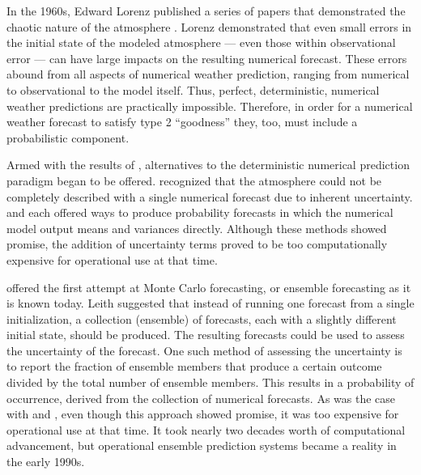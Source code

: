 In the 1960s, Edward Lorenz published a series of papers that demonstrated the chaotic nature of the atmosphere \citep{Lorenz1963, Lorenz1965, Lorenz1968}.
Lorenz demonstrated that even small errors in the initial state of the modeled atmosphere --- even those within observational error --- can have large impacts on the resulting numerical forecast.
These errors abound from all aspects of numerical weather prediction, ranging from numerical to observational to the model itself.
Thus, perfect, deterministic, numerical weather predictions are practically impossible.
Therefore, in order for a numerical weather forecast to satisfy type 2 ``goodness'' they, too, must include a probabilistic component.


Armed with the results of \cite{Lorenz1963, Lorenz1965, Lorenz1968}, alternatives to the deterministic numerical prediction paradigm began to be offered.
\cite{Epstein1969} recognized that the atmosphere could not be completely described with a single numerical forecast due to inherent uncertainty.
\cite{Epstein1969} and \cite{Gleeson1970} each offered ways to produce probability forecasts in which the numerical model output means and variances directly.
Although these methods showed promise, the addition of uncertainty terms proved to be too computationally expensive for operational use at that time.


\cite{Leith1974} offered the first attempt at Monte Carlo forecasting, or ensemble forecasting as it is known today.
Leith suggested that instead of running one forecast from a single initialization, a collection (ensemble) of forecasts, each with a slightly different initial state, should be produced.
The resulting forecasts could be used to assess the uncertainty of the forecast.
One such method of assessing the uncertainty is to report the fraction of ensemble members that produce a certain outcome divided by the total number of ensemble members.
This results in a probability of occurrence, derived from the collection of numerical forecasts.
As was the case with \cite{Epstein1969} and \cite{Gleeson1970}, even though this approach showed promise, it was too expensive for operational use at that time.
It took nearly two decades worth of computational advancement, but operational ensemble prediction systems became a reality in the early 1990s.


